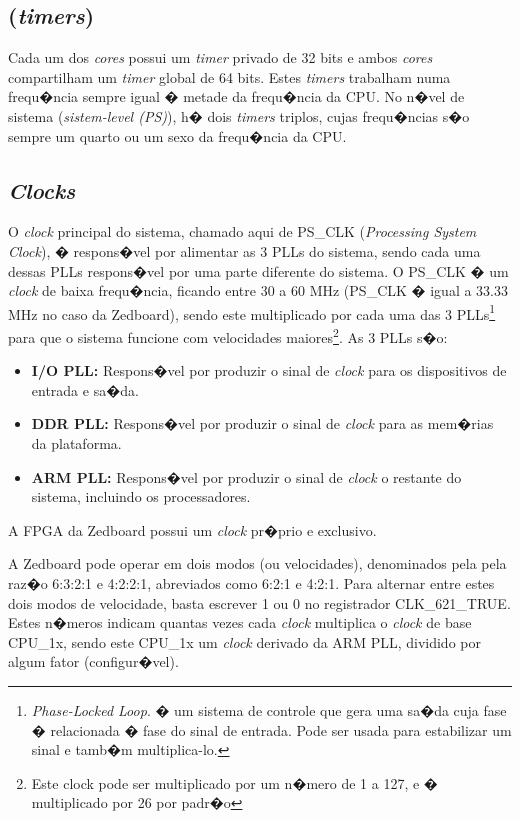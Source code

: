 \documentclass{ufscThesis/ufscThesis} %
\begin{document}
\subsection{(\emph{timers})}
Cada um dos \emph{cores} possui um \emph{timer} privado de 32 bits e ambos \emph{cores} compartilham um \emph{timer} global de 64 bits. Estes \emph{timers} trabalham numa frequ�ncia sempre igual � metade da frequ�ncia da CPU.
No n�vel de sistema (\emph{sistem-level (PS)}), h� dois \emph{timers} triplos, cujas frequ�ncias s�o sempre um quarto ou um sexo da frequ�ncia da CPU.




\subsection{\emph{Clocks}}

O \emph{clock} principal do sistema, chamado aqui de PS\_CLK (\emph{Processing System Clock}), � respons�vel por alimentar as 3 PLLs do sistema, sendo cada uma dessas PLLs respons�vel por uma parte diferente do sistema\cite[p.~622]{ug585}. O PS\_CLK � um \emph{clock} de baixa frequ�ncia, ficando entre 30 a 60 MHz (PS\_CLK � igual a 33.33 MHz no caso da Zedboard), sendo este multiplicado por cada uma das 3 PLLs\footnote{\emph{Phase-Locked Loop}. � um sistema de controle que gera uma sa�da cuja fase � relacionada � fase do sinal de entrada. Pode ser usada para estabilizar um sinal e tamb�m multiplica-lo.} para que o sistema funcione com velocidades maiores\footnote{Este clock pode ser multiplicado por um n�mero de 1 a 127, e � multiplicado por 26 por padr�o}. As 3 PLLs s�o:

\begin{itemize}
	\item \textbf{I/O PLL:} Respons�vel por produzir o sinal de \emph{clock} para os dispositivos de entrada e sa�da.
	\item \textbf{DDR PLL:} Respons�vel por produzir o sinal de \emph{clock} para as mem�rias da plataforma.
	\item \textbf{ARM PLL:} Respons�vel por produzir o sinal de \emph{clock} o restante do sistema, incluindo os processadores.
\end{itemize}

A FPGA da Zedboard possui um \emph{clock} pr�prio e exclusivo.

A Zedboard pode operar em dois modos (ou velocidades), denominados pela pela raz�o 6:3:2:1 e 4:2:2:1, abreviados como 6:2:1 e 4:2:1. Para alternar entre estes dois modos de velocidade, basta escrever 1 ou 0 no registrador CLK\_621\_TRUE. Estes n�meros indicam quantas vezes cada \emph{clock} multiplica o \emph{clock} de base CPU\_1x, sendo este CPU\_1x um \emph{clock} derivado da ARM PLL, dividido por algum fator (configur�vel).
\end{document}

